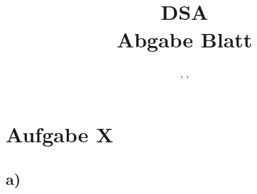 \documentclass[12pt]{scrartcl}
\title{DSA \\ \large Abgabe Blatt \workSheet}
\author{\anton, \jannik, \omid}
\date{\dateOfFinishing }
\begin{document}
	\maketitle
	\newpage


	\section*{Aufgabe X}
	\subsection*{a)}








\end{document}
